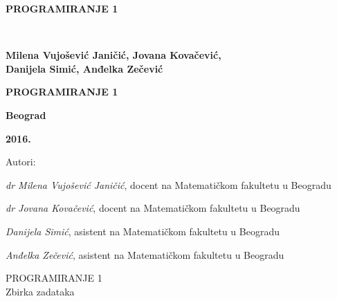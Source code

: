 \pagestyle{empty}

\vspace*{20pt}
\centerline{{\large\bfseries PROGRAMIRANJE 1} \vspace*{2mm}}
\newpage
\verb" "
\newpage
\begin{center}
{\sffamily


\vspace*{1cm}

{\fontsize{16pt}{19pt}\selectfont \bfseries  Milena Vujošević Janičić, Jovana Kovačević,\\ 
Danijela Simić, Anđelka Zečević}

\vspace{50pt}
\centerline{{\huge\bfseries PROGRAMIRANJE 1} \vspace*{2mm}}
\centerline{{\huge\bfseries {\fontsize{22pt}{26pt}\selectfont {Zbirka zadataka }}}}


\vspace{8cm}

\centerline{{\Large \bfseries Beograd}}
\centerline{{\Large \bfseries 2016.}}

}
\end{center}



\newpage


\small

\noindent
Autori: 

\noindent
{\slshape dr Milena Vujošević Janičić}, docent na Matematičkom fakultetu u Beogradu

\noindent
{\slshape dr Jovana Kovačević}, docent na Matematičkom fakultetu u Beogradu

\noindent
{\slshape Danijela Simić}, asistent na Matematičkom fakultetu u Beogradu

\noindent
{\slshape Anđelka Zečević}, asistent na Matematičkom fakultetu u Beogradu

\vspace*{2mm}

\noindent
PROGRAMIRANJE 1\\
Zbirka zadataka %
\vspace*{2mm}


